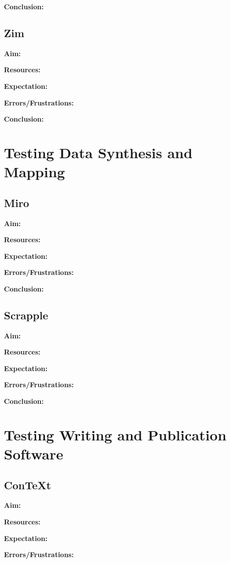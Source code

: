 \documentclass{article}
\begin{document}
\textbf{Conclusion:}


\subsection{Zim}
\textbf{Aim:}

\textbf{Resources:}

\textbf{Expectation:}

\label{Error: Zim Errors/Frustrations}
\textbf{Errors/Frustrations:}

\textbf{Conclusion:}

\section{Testing Data Synthesis and Mapping}

\subsection{Miro}
\textbf{Aim:}

\textbf{Resources:}

\textbf{Expectation:}

\label{Error: Miro Errors/Frustrations}
\textbf{Errors/Frustrations:}

\textbf{Conclusion:}

\subsection{Scrapple}
\textbf{Aim:}

\textbf{Resources:}

\textbf{Expectation:}

\label{Error: Scrapple Errors/Frustrations}
\textbf{Errors/Frustrations:}

\textbf{Conclusion:}
\section{Testing Writing and Publication Software}


\subsection{ConTeXt}

\textbf{Aim:}

\textbf{Resources:}

\textbf{Expectation:}

\label{Error: ConTeXt Errors/Frustrations}
\textbf{Errors/Frustrations:}
\end{document}
